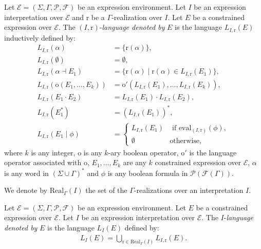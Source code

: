 \documentclass[a4paper]{llncs}
\begin{document}
  \begin{definition}[(I,r)-Language]\label{def i r lang}
    Let $\mathcal{E}=(\Sigma,\Gamma,\mathcal{P},\mathcal{F})$ be an expression environment. Let $I$ be an expression interpretation over $\mathcal{E}$ and $\mathrm{r}$ be a $\Gamma$-realization over $I$. Let $E$ be a constrained expression over $\mathcal{E}$.
    The $(I,\mathrm{r})$-\emph{language denoted by} $E$ is the language $L_{I,\mathrm{r}}(E)$ inductively defined by:
    \begin{align*}
      L_{I,\mathrm{r}}(\alpha)&=\{\mathrm{r}(\alpha)\},\\
      L_{I,\mathrm{r}}(\emptyset)&=\emptyset,\\
      L_{I,\mathrm{r}}(\alpha\dashv E_1)&=\{\mathrm{r}(\alpha) \mid \mathrm{r}(\alpha)\in L_{I,\mathrm{r}}(E_1)\},\\
      L_{I,\mathrm{r}}(\mathrm{o}(E_1,\ldots,E_k))&=\mathrm{o}'(L_{I,\mathrm{r}}(E_1),\ldots,L_{I,\mathrm{r}}(E_k)),\\
      L_{I,\mathrm{r}}(E_1\cdot E_2)&=L_{I,\mathrm{r}}(E_1)\cdot L_{I,\mathrm{r}}(E_2),\\
      L_{I,\mathrm{r}}(E_1^*)&=(L_{I,\mathrm{r}}(E_1))^*,\\
      L_{I,\mathrm{r}}(E_1 \mid \phi)&=
        \begin{cases}
            L_{I,\mathrm{r}}(E_1) & \text{ if } \mathrm{eval}_{(I,\mathrm{r})}(\phi),\\
            \emptyset & \text{otherwise,}
        \end{cases}
    \end{align*}
    where $k$ is any integer, $\mathrm{o}$ is any $k$-ary boolean operator, $\mathrm{o}'$ is the language operator associated with $\mathrm{o}$, $E_1,\ldots,E_k$ are any $k$ constrained expression over $\mathcal{E}$, $\alpha$ is any word in $(\Sigma\cup \Gamma)^*$ and $\phi$ is any boolean formula in $\mathcal{P}(\mathcal{F}(\Gamma))$.
  \end{definition}
  
  We denote by $\mathrm{Real}_\Gamma(I)$ the set of the $\Gamma$-realizations over an interpretation $I$.
    
  \begin{definition}[I-Language]
    Let $\mathcal{E}=(\Sigma,\Gamma,\mathcal{P},\mathcal{F})$ be an expression environment. Let $E$ be a constrained expression over $\mathcal{E}$. Let $I$ be an expression interpretation over $\mathcal{E}$. The $I$-\emph{language denoted by} $E$ is the language $L_{I}(E)$ defined by:
    \begin{align*}
      L_{I}(E)=\bigcup_{\mathrm{r}\in \mathrm{Real}_\Gamma(I)}L_{I,\mathrm{r}}(E).
    \end{align*}
  \end{definition}
  
\end{document}
